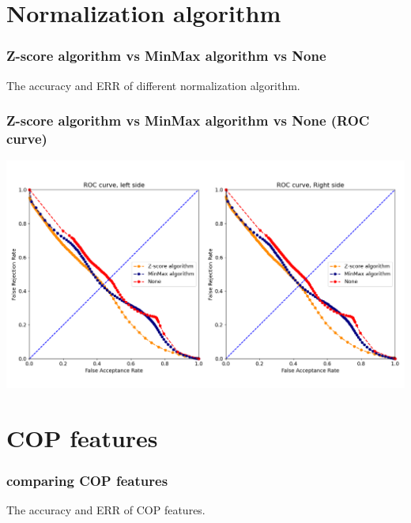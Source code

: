 \documentclass{beamer}
\begin{document}
\section{Normalization algorithm}
\def \variable {MinMax}%

\begin{frame}
\frametitle{Z-score algorithm vs MinMax algorithm vs None}
\tiny
\begin{table}
\centering
\captionsetup{labelformat=empty}
\caption{\small The accuracy and ERR of different normalization algorithm.}
\label{tab:parameters condition}

\end{table}
\end{frame}


\begin{frame}
\centering
\frametitle{Z-score algorithm vs MinMax algorithm vs None (ROC curve)}
\includegraphics[scale=0.3]{Manuscripts/src/figures/MinMax.png}
\end{frame}




\section{COP features}


\begin{frame}
\frametitle{comparing COP features}
\tiny
\begin{table}
\centering
\captionsetup{labelformat=empty}
\caption{\tiny The accuracy and ERR of COP features.}
\label{tab:parameters condition}

\end{table}
\end{frame}
\end{document}
